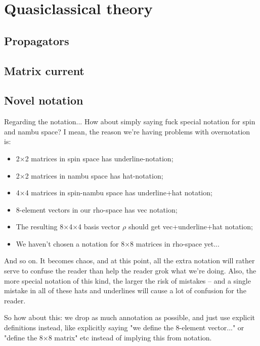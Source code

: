 \chapter{Quasiclassical theory}
\section{Propagators}
\section{Matrix current}

\section{Novel notation}
Regarding the notation... How about simply saying fuck special notation for spin and nambu space? I mean, the reason we're having problems with overnotation is:
\begin{itemize}
  \item 2×2 matrices in spin space has underline-notation;
  \item 2×2 matrices in nambu space has hat-notation;
  \item 4×4 matrices in spin-nambu space has underline+hat notation;
  \item 8-element vectors in our rho-space has vec notation;
  \item The resulting 8×4×4 basis vector $\rho$ should get vec+underline+hat notation;
  \item We haven't chosen a notation for 8×8 matrices in rho-space yet...
\end{itemize}
And so on. It becomes chaos, and at this point, all the extra notation will rather serve to confuse the reader than help the reader grok what we're doing. Also,
the more special notation of this kind, the larger the risk of mistakes -- and a single mistake in all of these hats and underlines will cause a lot of confusion for the reader.

So how about this: we drop as much annotation as possible, and just use explicit definitions instead, like explicitly saying "we define the 8-element vector..." or "define the 8×8 matrix" etc instead of implying this from notation.

